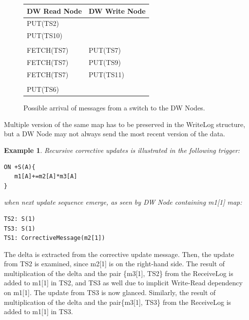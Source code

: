 \documentclass{sig-semester}
\newtheorem{example}[theorem]{Example}
\begin{document}
\begin{figure}
\begin{center}

\begin{tabular}{l|l}
DW Read Node      &     DW Write Node\\
\hline
PUT(TS2)   & \\
PUT(TS10)  & \\
           & \\
FETCH(TS7) & PUT(TS7)  \\
FETCH(TS7) & PUT(TS9)  \\
FETCH(TS7) & PUT(TS11)  \\
           & \\
PUT(TS6)   & \\   
\end{tabular}
\end{center}

\vspace{-3mm}
\caption{Possible arrival of messages from a switch to the DW Nodes.}
\label{fig:correct}
\vspace{-2mm}
\end{figure}

Multiple version of the same map has to be preserved in the WriteLog structure, but a DW Node may not always send the most recent version of the data.

\begin{example} \em
\label{ex:recursive}
Recursive corrective updates is illustrated in the following trigger:
\begin{verbatim}
ON +S(A){
   m1[A]+=m2[A]*m3[A]
}
\end{verbatim}
when next update sequence emerge, as seen by DW Node containing m1[1] map:
\begin{verbatim}
TS2: S(1)
TS3: S(1)
TS1: CorrectiveMessage(m2[1])
\end{verbatim}
\end{example}
The delta is extracted from the corrective update message. Then, the update from TS2 is examined, since m2[1] is on the right-hand side. The result of multiplication of the delta and the pair \{m3[1], TS2\} from the ReceiveLog is added to m1[1] in TS2, and TS3 as well due to implicit Write-Read dependency on m1[1]. The update from TS3 is now glanced. Similarly, the result of multiplication of the delta and the pair\{m3[1], TS3\} from the ReceiveLog is added to m1[1] in TS3.
\end{document}
